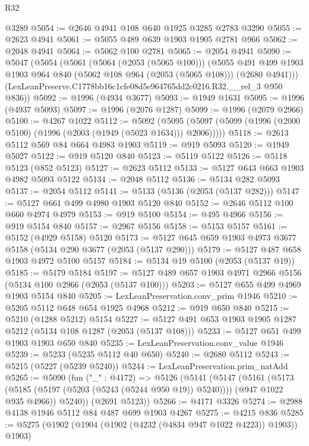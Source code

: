 \begin{lexlean}{R32}
\begin{coremodule}
    @3289
@5054 := @2646 @4941 @108 @640 @1925 @3285 @2783 @3290
@5055 := @2623 @4941
@5061 := @5055 @489 @639 @1903 @1905 @2781 @966
@5062 := @2048 @4941
@5064 := @5062 @100 @2781
@5065 := @2054 @4941
@5090 := @5047
    (@5054
      (@5061
        (@5064 (@2053 (@5065 @100)))
        (@5055
          @491
          @499
          @1903
          @1903
          @964
          @840
          (@5062 @108 @964 (@2053 (@5065 @108)))
          (@2680 @4941)))
      (LexLeanPreserve.C1778bb16c1cfe08d5e964765dd2c0216.R32.__rel_3 @950 @836))
@5092 := @1996 (@4934 @3677)
@5093 := @1949 @1631
@5095 := @1996 (@4937 @5093)
@5097 := @1996 (@2076 @1287)
@5099 := @1996 (@2079 @2966)
@5100 := @4267 @1022
@5112 := @5092
    (@5095 (@5097 (@5099 (@1996 (@2000 @5100) (@1996 (@2003 (@1949 (@5023 @1634))) @2006)))))
@5118 := @2613 @5112 @569 @84 @664 @4983 @1903
@5119 := @919 @5093
@5120 := @1949 @5027
@5122 := @919 @5120 @840
@5123 := @5119 @5122
@5126 := @5118 @5123 (@852 @5123)
@5127 := @2623 @5112
@5133 := @5127 @643 @663 @1903 @4982 @5093 @5122
@5134 := @2048 @5112
@5136 := @5134 @282 @5093
@5137 := @2054 @5112
@5141 := @5133 (@5136 (@2053 (@5137 @282)))
@5147 := @5127 @661 @499 @4980 @1903 @5120 @840
@5152 := @2646 @5112 @100 @660 @4974 @4979
@5153 := @919 @5100
@5154 := @495 @4966
@5156 := @919 @5154 @840
@5157 := @2967 @5156
@5158 := @5153 @5157
@5161 := @5152 (@4929 @5158) @5120
@5173 := @5127 @645 @659 @1903 @4973 @3677 @5158 (@5134 @290 @3677 (@2053 (@5137 @290)))
@5179 := @5127 @487 @658 @1903 @4972 @5100 @5157
@5184 := @5134 @19 @5100 (@2053 (@5137 @19))
@5185 := @5179 @5184
@5197 := @5127 @489 @657 @1903 @4971 @2966 @5156 (@5134 @100 @2966 (@2053 (@5137 @100)))
@5203 := @5127 @655 @499 @4969 @1903 @5154 @840
@5205 := LexLeanPreservation.conv_prim @1946
@5210 := @5205 @5112 @648 @654 @1925 @4968
@5212 := @919 @650 @840
@5215 := @5210 (@1288 @5212) @5154
@5227 := @5127 @491 @653 @1903 @1905 @1287 @5212 (@5134 @108 @1287 (@2053 (@5137 @108)))
@5233 := @5127 @651 @499 @1903 @1903 @650 @840
@5235 := LexLeanPreservation.conv_value @1946
@5239 := @5233 (@5235 @5112 @40 @650)
@5240 := @2680 @5112
@5243 := @5215 (@5227 (@5239 @5240))
@5244 := LexLeanPreservation.prim_natAdd
@5265 := @5090
    (fun ("_" : @4172) =>
    @5126
      (@5141
        (@5147
          (@5161
            (@5173 (@5185 (@5197 (@5203 (@5243 (@5244 @950 @19)) @5240))))
            (@947 @1022 @935 @4966))
          @5240))
      (@2691 @5123))
@5266 := @4171 @3326
@5274 := @2988 @4138 @1946 @5112 @84 @487 @699 @1903 @4267
@5275 := @4215 @836
@5285 := @5275 (@1902 (@1904 (@1902 (@4232 (@4834 @947 @1022 @4223)) @1903)) @1903)

\end{coremodule}
\end{lexlean}
